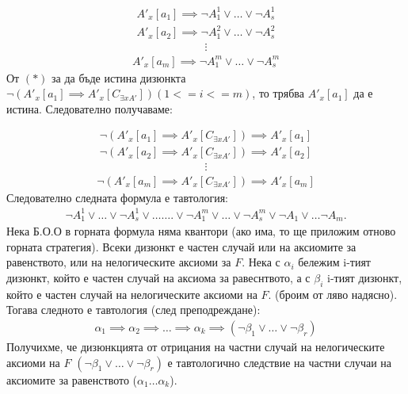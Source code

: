 \documentclass[french]{article}
\begin{document}
\begin{align*}
 A'_x[a_1] \implies \neg A_1^1 \lor  \dots \lor  \neg A_s^1
\end{align*}
\begin{align*}
A'_x[a_2] \implies \neg A_1^2 \lor  \dots \lor  \neg A_s^2
\end{align*}
\begin{align*}
\vdots
\end{align*}
\begin{align*}
A'_x[a_m] \implies \neg A_1^m \lor  \dots \lor  \neg A_s^m
\end{align*}
От $(*)$  за да бъде истина дизюнкта $\neg (A'_x[a_1] \implies A'_x[C_{\exists x A'}]) (1<=i<=m)$, то трябва $A'_x[a_1]$ да е истина. Следователно получаваме:

\begin{align*}
\neg (A'_x[a_1] \implies A'_x[C_{\exists x A'}]) \implies A'_x[a_1]
\end{align*}
\begin{align*}
\neg (A'_x[a_2] \implies A'_x[C_{\exists x A'}]) \implies A'_x[a_2]
\end{align*}
\begin{align*}
\vdots
\end{align*}
\begin{align*}
\neg (A'_x[a_m] \implies A'_x[C_{\exists x A'}]) \implies A'_x[a_m]
\end{align*}
Следователно следната формула е тавтология:
\begin{align*}
\neg A_1^1 \lor \dots \lor \neg A_s^1 \lor \dots \dots.  \lor \neg A_1^m \lor \dots \lor \neg A_s^m \lor \neg A_1 \lor \dots \neg A_m.
\end{align*}
Нека Б.О.О в горната формула няма квантори (ако има, то ще приложим отново горната стратегия). Всеки дизюнкт е частен случай или на аксиомите за равенството, или на нелогическите аксиоми за $F$. Нека с $\alpha_i$ бележим i-тият дизюнкт, който е частен случай на аксиома за равеснтвото, а с $\beta_i$ i-тият дизюнкт, който е частен случай на нелогическите аксиоми на $F$. (броим от ляво надясно). 
Тогава следното е тавтология (след преподреждане):
\begin{align*}
\alpha_1 \implies \alpha_2 \implies \dots \implies \alpha_k  \implies (\neg \beta_1 \lor \dots \lor \neg \beta_r) 
\end{align*}
Получихме, че дизюнкцията от отрицания на частни случай на нелогическите аксиоми на $F$ $(\neg \beta_1 \lor \dots \lor \neg \beta_r)$ е тавтологично следствие на частни случаи на аксиомите за равенството ($\alpha_1 \dots \alpha_k$).
\end{document}
